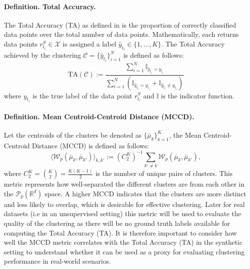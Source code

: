 \documentclass[12pt,a4paper]{report}
\begin{document}
\paragraph{Definition. Total Accuracy.} The Total Accuracy (TA) as defined in \cite{LuanHamp2025} is the proportion of correctly classified data points over the total number of data points.
Mathematically, each returns data points $r_{t_i}^{S} \in \mathcal{X}$ is assigned a label $\hat{y}_{t_i} \in \{1, \dots, K\}$. The Total Accuracy achieved by the clustering 
$\mathcal{C} = \{\hat{y}_{t_i}\}_{i=1}^{N}$ is defined as follows:
\begin{equation}
    \text{TA}(\mathcal{C}) := \frac{\sum_{i=1}^{N} \mathbb{I}_{\hat{y}_{t_i} = y_{t_i}}}{\sum_{i=1}^{N}(\mathbb{I}_{\hat{y}_{t_i} = y_{t_i}}+ \mathbb{I}_{\hat{y}_{t_i} \neq y_{t_i}})}
\end{equation}
where $y_{t_i}$ is the true label of the data point $r_{t_i}^{S}$ and $\mathbb{I}$ is the indicator function.

\paragraph{Definition. Mean Centroid-Centroid Distance (MCCD).} Let the centroids of the clusters be denoted as $\{\bar{\mu}_k\}_{k=1}^{K}$, the Mean Centroid-Centroid Distance (MCCD) is defined as follows:
\begin{equation}
\langle \mathcal{W}_p(\bar{\mu}_k, \bar{\mu}_{k'}) \rangle_{k,k'} := (C_2^K)^{-1} \sum_{k' \neq k} \mathcal{W}_p(\bar{\mu}_k, \bar{\mu}_{k'}), \tag{26}
\end{equation}
where $C_2^K = \binom{K}{2} = \frac{K(K-1)}{2}$ is the number of unique pairs of clusters.
This metric represents how well-separated the different clusters are from each other in the $\mathcal{P}_p(\mathbb{R}^d)$ space. A higher MCCD indicates that the clusters are more distinct and less likely to overlap, which is desirable for effective clustering.
Later for real datasets (i.e in an unsupervised setting) this metric will be used to evaluate the quality of the clustering as there will be no ground truth labels available for computing the Total Accuracy (TA).
It is therefore important to consider how well the MCCD metric correlates with the Total Accuracy (TA) in the synthetic setting to understand whether it can be used as a proxy for evaluating clustering performance in real-world scenarios.
\end{document}

